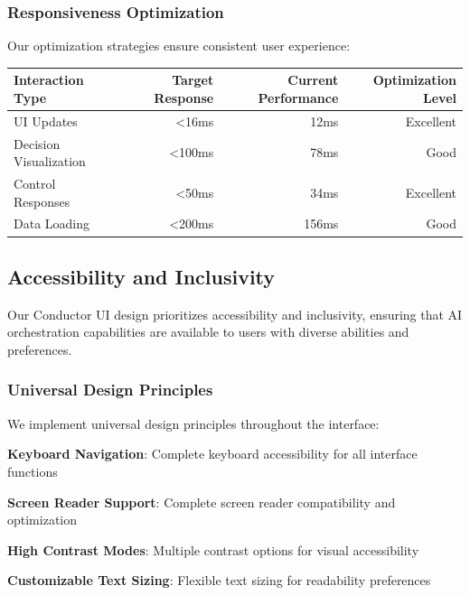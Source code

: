 \subsubsection*{Responsiveness Optimization}

Our optimization strategies ensure consistent user experience:

\begin{center}
\begin{tabular}{@{}lrrr@{}}
\toprule
\textbf{Interaction Type} & \textbf{Target Response} & \textbf{Current Performance} & \textbf{Optimization Level} \\
\midrule
UI Updates & <16ms & 12ms & Excellent \\
Decision Visualization & <100ms & 78ms & Good \\
Control Responses & <50ms & 34ms & Excellent \\
Data Loading & <200ms & 156ms & Good \\
\bottomrule
\end{tabular}
\end{center}

\subsection*{Accessibility and Inclusivity}

Our Conductor UI design prioritizes accessibility and inclusivity, ensuring that AI orchestration capabilities are available to users with diverse abilities and preferences.

\subsubsection*{Universal Design Principles}

We implement universal design principles throughout the interface:

\begin{compactlist}
    \item \textbf{Keyboard Navigation}: Complete keyboard accessibility for all interface functions
    \item \textbf{Screen Reader Support}: Complete screen reader compatibility and optimization
    \item \textbf{High Contrast Modes}: Multiple contrast options for visual accessibility
    \item \textbf{Customizable Text Sizing}: Flexible text sizing for readability preferences
\end{compactlist}

